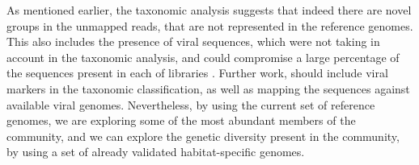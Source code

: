 As mentioned earlier, the taxonomic analysis suggests that indeed there are novel groups in the unmapped reads, that are not represented in the reference genomes. This also includes the presence of viral sequences, which were not taking in account in the taxonomic analysis, and could compromise a large percentage of the sequences present in each of libraries \cite{RodriguezBrito:2010in,Emerson:tk}. Further work, should include viral markers in the taxonomic classification, as well as mapping the sequences against available viral genomes. Nevertheless, by using the current set of reference genomes, we are exploring some of the most abundant members of the community, and we can explore the genetic diversity present in the community, by using a set of already validated habitat-specific genomes.

